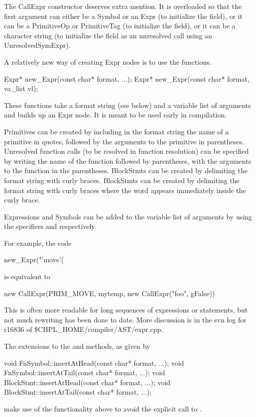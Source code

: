 \documentclass[10pt]{article}
\begin{document}
The CallExpr constructor deserves extra mention.  It is overloaded so
that the first argument can either be a Symbol or an Expr (to
initialize the  field), or it can be a PrimitiveOp or
PrimitiveTag (to initialize the  field), or it can be a
character string (to initialize the  field as an
unresolved call using an UnresolvedSymExpr).

A relatively new way of creating Expr nodes is to use the
 functions.
\begin{clang}
Expr* new_Expr(const char* format, ...);
Expr* new_Expr(const char* format, va_list vl);
\end{clang}
These functions take a format string (see below) and a variable list of arguments
and builds up an Expr node.  It is meant to be used early in
compilation.

Primitives can be created by including in the format string
the name of a primitive in quotes, followed by the arguments to the
primitive in parentheses.  Unresolved function calls (to be
resolved in function resolution) can be specified by writing the name
of the function followed by parentheses, with the arguments to the
function in the parentheses.  BlockStmts can be created by delimiting
the format string with curly braces.   BlockStmts can
be created by delimiting the format string with curly braces where the
word  appears immediately inside the curly brace.

Expressions and Symbols can be added to the variable list of arguments
by using the specifiers  and  respectively.

For example, the code
\begin{clang}
new_Expr("'move'(%
\end{clang}
is equivalent to
\begin{clang}
new CallExpr(PRIM_MOVE, mytemp, new CallExpr("foo", gFalse))
\end{clang}
This is often more readable for long sequences of expressions or
statements, but not much rewriting has been done to date.
More discussion is in the svn log for r16836 of
\$CHPL\_HOME/compiler/AST/expr.cpp.

The extensions to the  and  methods,
as given by
\begin{clang}
void FnSymbol::insertAtHead(const char* format, ...);
void FnSymbol::insertAtTail(const char* format, ...);
void BlockStmt::insertAtHead(const char* format, ...);
void BlockStmt::insertAtTail(const char* format, ...);
\end{clang}
make use of the  functionality above to avoid the
explicit call to .
\end{document}
